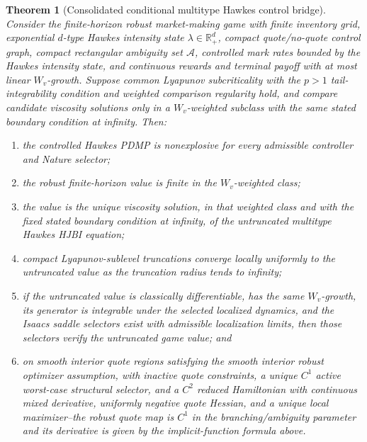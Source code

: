 \documentclass[11pt]{article}
\newtheorem{theorem}[assumption]{Theorem}
\newcommand{\R}{\mathbb{R}}
\begin{document}
\begin{theorem}[Consolidated conditional multitype Hawkes control bridge]
Consider the finite-horizon robust market-making game with finite inventory
grid, exponential $d$-type Hawkes intensity state $\lambda\in\R_+^d$, compact
quote/no-quote control graph, compact rectangular ambiguity set $\mathcal A$,
controlled mark rates bounded by the Hawkes intensity state, and continuous
rewards and terminal payoff with at most linear $W_v$-growth. Suppose common
Lyapunov subcriticality with the $p>1$ tail-integrability condition and
weighted comparison regularity hold, and compare candidate viscosity solutions
only in a $W_v$-weighted subclass with the same stated boundary condition at
infinity. Then:
\begin{enumerate}
\item the controlled Hawkes PDMP is nonexplosive for every admissible
controller and Nature selector;
\item the robust finite-horizon value is finite in the $W_v$-weighted class;
\item the value is the unique viscosity solution, in that weighted class and
with the fixed stated boundary condition at infinity, of the untruncated
multitype Hawkes HJBI equation;
\item compact Lyapunov-sublevel truncations converge locally uniformly to the
untruncated value as the truncation radius tends to infinity;
\item if the untruncated value is classically differentiable, has the same
$W_v$-growth, its generator is integrable under the selected localized
dynamics, and the Isaacs saddle selectors exist with admissible localization
limits, then those selectors verify the untruncated game value; and
\item on smooth interior quote regions satisfying the smooth interior robust
optimizer assumption, with inactive quote constraints, a unique $C^1$ active
worst-case structural selector, and a $C^2$ reduced Hamiltonian with continuous
mixed derivative, uniformly negative quote Hessian, and a unique local
maximizer--the robust quote map is $C^1$ in the branching/ambiguity parameter
and its derivative is given by the implicit-function formula above.
\end{enumerate}
\end{theorem}
\end{document}
